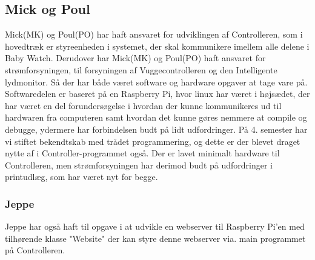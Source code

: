 \subsection*{Mick og Poul}
Mick(MK) og Poul(PO) har haft ansvaret for udviklingen af Controlleren, som i hovedtræk er styreenheden i systemet, der skal kommunikere imellem alle delene i Baby Watch. Derudover har Mick(MK) og Poul(PO) haft ansvaret for strømforsyningen, til forsyningen af Vuggecontrolleren og den Intelligente lydmonitor. Så der har både været software og hardware opgaver at tage vare på. Softwaredelen er baseret på en Raspberry Pi, hvor linux har været i højsædet, der har været en del forundersøgelse i hvordan der kunne kommunikeres ud til hardwaren fra computeren samt hvordan det kunne gøres nemmere at compile og debugge, ydermere har \iic forbindelsen budt på lidt udfordringer. På 4. semester har vi stiftet bekendtskab med trådet programmering, og dette er der blevet draget nytte af i Controller-programmet også. Der er lavet minimalt hardware til Controlleren, men strømforsyningen har derimod budt på udfordringer i printudlæg, som har været nyt for begge.

\subsubsection*{Jeppe}
Jeppe har også haft til opgave i at udvikle en webserver til Raspberry Pi'en med tilhørende klasse "Website" der kan styre denne webserver via. main programmet på Controlleren.